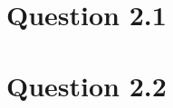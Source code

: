 \documentclass[10pt]{article}
\begin{document}

\section*{Question 2.1} %
\label{sec:question_2_1}


\section*{Question 2.2} %
\label{sec:question_2_2}




%
%
\end{document}
